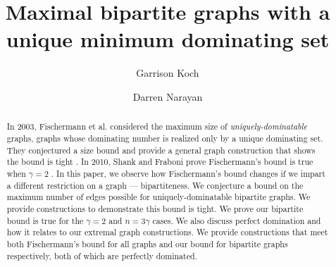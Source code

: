 \documentclass[12pt]{amsart}
\begin{document}
\thispagestyle{empty}
\title{ Maximal bipartite graphs with a unique minimum dominating set}

\author{Garrison Koch}
\address{Rochester Institute of Technology}

\author{Darren Narayan}
\address{Rochester Institute of Technology}


\begin{abstract}
\noindent  In 2003, Fischermann et al. considered the maximum size of \textit{uniquely-dominatable} graphs, graphs whose dominating number is realized only by a unique dominating set. They conjectured a size bound and provide a general graph construction that shows the bound is tight \cite{Original_Paper}. In 2010, Shank and Fraboni prove Fischermann's bound is true when $\gamma = 2$ \cite{Shank_paper}. In this paper, we observe how Fischermann's bound changes if we impart a different restriction on a graph --- bipartiteness. We conjecture a bound on the maximum number of edges possible for uniquely-dominatable bipartite graphs. We provide constructions to demonstrate this bound is tight. We prove our bipartite bound is true for the $\gamma = 2$ and $n = 3\gamma$ cases. We also discuss perfect domination and how it relates to our extremal graph constructions. We provide constructions that meet both Fischermann's bound for all graphs and our bound for bipartite graphs respectively, both of which are perfectly dominated.
\end{abstract}

\maketitle

\renewcommand{\baselinestretch}{1.2}
\end{document}
